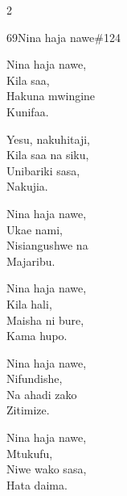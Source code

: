\begin{multicols}{2}
\begin{hymn}{69}{Nina haja nawe}{\#124}
\begin{stanza}
Nina haja nawe,\\
Kila saa,\\
Hakuna mwingine\\
Kunifaa.
\end{stanza}
\begin{chorus}
Yesu, nakuhitaji,\\
Kila saa na siku,\\
Unibariki sasa,\\
Nakujia.
\end{chorus}
\begin{stanza}
Nina haja nawe,\\
Ukae nami,\\
Nisiangushwe na\\
Majaribu.
\end{stanza}
\begin{stanza}
Nina haja nawe,\\
Kila hali,\\
Maisha ni bure,\\
Kama hupo.
\end{stanza}
\begin{stanza}
Nina haja nawe,\\
Nifundishe,\\
Na ahadi zako\\
Zitimize.
\end{stanza}
\begin{stanza}
Nina haja nawe,\\
Mtukufu,\\
Niwe wako sasa,\\
Hata daima.
\end{stanza}
\end{hymn}


\end{multicols}
